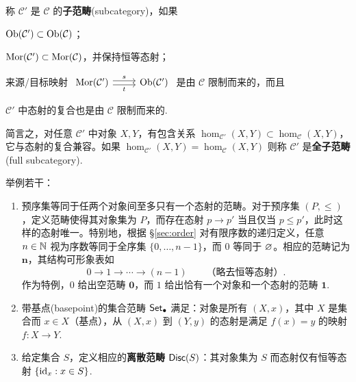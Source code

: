 \begin{definition}
	称 $\mathcal{C}'$ 是 $\mathcal{C}$ 的\textbf{子范畴}(subcategory)，如果
	\begin{compactenum}[(i)]
		\item $\operatorname{Ob}(\mathcal{C}') \subset \operatorname{Ob}(\mathcal{C})$；
		\item $\operatorname{Mor}(\mathcal{C}') \subset \operatorname{Mor}(\mathcal{C})$，并保持恒等态射；
		\item 来源/目标映射 $\begin{tikzcd} \Mor(\mathcal{C}') \arrow[yshift=-0.5ex, r, "t"'] \arrow[yshift=0.5ex, r, "s"] & \Obj(\mathcal{C}') \end{tikzcd}$ 是由 $\mathcal{C}$ 限制而来的，而且
		\item $\mathcal{C}'$ 中态射的复合也是由 $\mathcal{C}$ 限制而来的.
	\end{compactenum}
	简言之，对任意 $\mathcal{C}'$ 中对象 $X, Y$，有包含关系 $\hom_{\mathcal{C}'}(X, Y) \subset \hom_{\mathcal{C}}(X, Y)$，它与态射的复合兼容。如果 $\hom_{\mathcal{C}'}(X, Y) = \hom_{\mathcal{C}}(X, Y)$ 则称 $\mathcal{C}'$ 是\textbf{全子范畴}(full subcategory).
\end{definition}

\begin{example}\label{eg:categories}
	举例若干：
	\begin{enumerate}
		\item 预序集等同于任两个对象间至多只有一个态射的范畴。对于预序集 $(P, \leqslant)$，定义范畴使得其对象集为 $P$，而存在态射 $p \to p'$ 当且仅当 $p \leqslant p'$，此时这样的态射唯一。特别地，根据 \S\ref{sec:order} 对有限序数的递归定义，任意 $n \in \mathbb{N}$ 视为序数等同于全序集 $\{0, \ldots, n-1\}$，而 $0$ 等同于 $\varnothing$。相应的范畴记为 $\mathbf{n}$，其结构可形象表如
		\[ 0 \to 1 \to \cdots \to (n-1) \qquad \text{（略去恒等态射）}. \]
		作为特例，$0$ 给出空范畴 $\mathbf{0}$，而 $1$ 给出恰有一个对象和一个态射的范畴 $\mathbf{1}$.
		\item 带基点(basepoint)的集合范畴 $\mathsf{Set}_\bullet$ 满足：对象是所有 $(X, x)$，其中 $X$ 是集合而 $x \in X$（基点），从 $(X,x)$ 到 $(Y,y)$ 的态射是满足 $f(x)=y$ 的映射 $f: X \to Y$.
		\item 给定集合 $S$，定义相应的\textbf{离散范畴} $\mathsf{Disc}(S)$：其对象集为 $S$ 而态射仅有恒等态射 $\{ \mathrm{id}_x : x \in S \}$.
	\end{enumerate}
\end{example}

